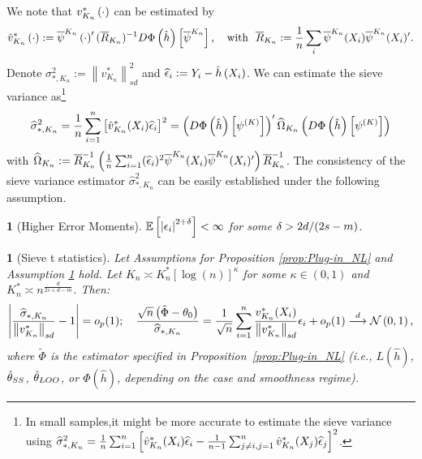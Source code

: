 \documentclass[12pt,american]{article}
\theoremstyle{definition}
\theoremstyle{plain}
\newtheorem{assumption}{\protect\assumptionname}
\theoremstyle{definition}
\theoremstyle{plain}
\theoremstyle{plain}
\theoremstyle{plain}
\theoremstyle{plain}
\newtheorem{prop}{\protect\propositionname}
\theoremstyle{plain}
\newcommand{\E}{\mathbb{E}}
\newcommand{\norm}[1]{\left\| #1 \right\|}
\newcommand{\abs}[1]{\left| #1 \right|}
\providecommand{\assumptionname}{Assumption}
\providecommand{\assumptionname}{Assumption}
\providecommand{\propositionname}{Proposition}
\begin{document}
We note that $v_{K_n}^{*}\left(\cdot\right)$ can be estimated by
\[
  \hat{v}_{K_{n}}^{*}\left(\cdot\right):=\overline{\psi}^{K_{n}}\left(\cdot\right)'(\overline{R}_{K_{n}})^{-1}D\Phi\left(\hat{h}\right)\left[\overline{\psi}^{K_{n}}\right],~~~\text{with}~~\overline{R}_{K_n} :=\frac{1}{n} \sum_i{\overline{\psi}}^{K_{n}}(X_i){\overline{\psi}}^{K_{n}}(X_i)'.
\]
Denote $\sigma^2_{*,K_{n}} :=\norm{v_{K_{n}}^{*}}_{sd}^2$ and $\widehat{\epsilon}_i:=Y_{i}-\hat{h}\left(X_{i}\right)$. We can estimate the sieve variance as\footnote{In small samples,it might be more accurate to estimate the sieve variance using $\widehat{\sigma}^2_{*,K_{n}}=\frac{1}{n}\sum_{i=1}^n \left[ \hat{v}_{K_{n}}^{*}(X_{i})\widehat{\epsilon}_i - \frac{1}{n-1}\sum_{j\neq i,j=1}^n\hat{v}_{K_{n}}^{*}(X_{j})\widehat{\epsilon}_j\right]^{2}$.}
\begin{align}\label{sieveVar-hat}
  \widehat{\sigma}^2_{*,K_{n}}  =\frac{1}{n}\sum_{i=1}^n \left[ \hat{v}_{K_{n}}^{*}(X_{i})\widehat{\epsilon}_i\right]^{2}=\left(D\Phi\left(\hat{h}\right)\left[\psi^{\left(K\right)}\right]\right)'\widehat{\Omega}_{K_n}\left(D\Phi\left(\hat{h}\right)\left[\psi^{\left(K\right)}\right]\right)
\end{align}
with
$\widehat{\Omega}_{K_n}:= \overline{R}_{K_n}^{-1}\left(\frac{1}{n}\sum_{i=1}^{n}(\widehat{\epsilon}_i)^{2}{\overline{\psi}}^{K_{n}}(X_i){\overline{\psi}}^{K_{n}}(X_i)'\right) \overline{R}_{K_n}^{-1}$.
The consistency of the sieve variance estimator $\widehat{\sigma}^2_{*,K_{n}}$ can be easily established under the following assumption.

\begin{assumption}[Higher Error Moments]\label{assu:e2d_moment} $\E\left[\abs{\e_i}^{2+\d}\right] < \infty$ for some $\delta>2d/(2s-m)$.
\end{assumption}

\begin{prop}[Sieve t statistics]\label{prop:VarConsis}
  Let Assumptions for Proposition \ref{prop:Plug-in_NL} and Assumption \ref{assu:e2d_moment} hold. Let $K_{n}\asymp K^*_n [\log(n)]^{\kappa}$ for some $\kappa \in (0,1)$ and $K_{n}^{*}\asymp n^{\frac{d}{2s+d-m}}$. Then:
  \[
    \abs{\frac{\widehat{\sigma}_{*,K_{n}}}{\norm{v_{K_{n}}^{*}}_{sd} } - 1} =o_p(1);~~~
    \frac{\sqrt{n}\left(\tilde{\Phi}-\t_0\right)}{\widehat{\sigma}_{*,K_{n}}} = \frac{1}{\sqrt{n}}\sum_{i=1}^n \frac{v_{K_n}^*(X_i)}{\norm{v_{K_{n}}^{*}}_{sd}}\e_i +o_p(1)\dto\cN\left(0,1\right),
  \]
  where $\tilde{\Phi}$ is the estimator specified in Proposition~\ref{prop:Plug-in_NL} (i.e., $L(\hat{h})$, $\hat{\theta}_{SS}$, $\hat{\theta}_{LOO}$, or $\Phi(\hat{h})$, depending on the case and smoothness regime).
\end{prop}
\end{document}
